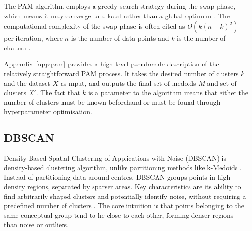 \documentclass[10pt,oneside]{report}
\begin{document}
The PAM algorithm employs a greedy search strategy during the swap phase, which means it may converge to a local rather than a global optimum \cite{kmedoids}. The computational complexity of the swap phase is often cited as $O(k(n - k)^2)$ per iteration, where $n$ is the number of data points and $k$ is the number of clusters \cite{kmedoids}.

Appendix~\ref{app:pam} provides a high-level pseudocode description of the relatively straightforward PAM process. It takes the desired number of clusters $k$ and the dataset $X$ as input, and outputs the final set of medoids $M$ and set of clusters $X'$. The fact that $k$ is a parameter to the algorithm means that either the number of clusters must be known beforehand or must be found through hyperparameter optimisation.



\subsection{DBSCAN} \label{sec:dbscan}

Density-Based Spatial Clustering of Applications with Noise (DBSCAN) is density-based clustering algorithm, unlike partitioning methods like k-Medoids \cite{ester1996density}.
Instead of partitioning data around centres, DBSCAN groups points in high-density regions, separated by sparser areas. Key characteristics are its ability to find arbitrarily shaped clusters and potentially identify noise, without requiring a predefined number of clusters \cite{ester1996density}. The core intuition is that points belonging to the same conceptual group tend to lie close to each other, forming denser regions than noise or outliers.

\end{document}
